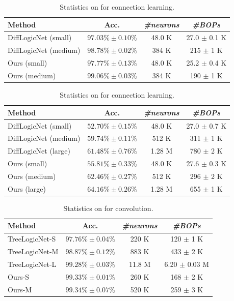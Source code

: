 \begin{table}[!htbp]
\centering
\caption{Statistics on \mnist for connection learning.}
\label{tb:DLGN_MNIST_rs}
\begin{tabular}{lccc}
\toprule
Method & Acc. & \emph{\#neurons} & \emph{\#BOPs} \\
\midrule
DiffLogicNet (small)    & $97.03\% \pm 0.10\%$ & 48.0 K & 27.0 $\pm$ 0.1 K \\
DiffLogicNet (medium)   & $98.78\% \pm 0.02\%$ & 384 K & 215 $\pm$ 1 K \\
\midrule
Ours (small)            & \textbf{$97.77\% \pm 0.13\%$} & 48.0 K & 25.2 $\pm$ 0.4 K \\
Ours (medium)           & \textbf{$99.06\% \pm 0.03\%$} & 384 K & 190 $\pm$ 1 K \\
\bottomrule
\end{tabular}
\end{table}

\begin{table}[!htbp]
\centering
\caption{Statistics on \cifar for connection learning.}
\label{tb:DLGN_CIFAR_rs}
\begin{tabular}{lccc}
\toprule
Method & Acc. & \emph{\#neurons} & \emph{\#BOPs} \\
\midrule
DiffLogicNet (small)    & $52.70\% \pm 0.15\%$ & 48.0 K & 27.0 $\pm$ 0.7 K \\
DiffLogicNet (medium)   & $59.74\% \pm 0.11\%$ & 512 K & 311 $\pm$ 1 K \\
DiffLogicNet (large)    & $61.48\% \pm 0.76\%$ & 1.28 M & 780 $\pm$ 2 K \\
\midrule
Ours (small)            & \textbf{$55.81\% \pm 0.33\%$} & 48.0 K & 27.6 $\pm$ 0.3 K \\
Ours (medium)            & \textbf{$62.46\% \pm 0.27\%$} & 512 K & 296 $\pm$ 2 K \\
Ours (large)            & \textbf{$64.16\% \pm 0.26\%$} & 1.28 M & 655 $\pm$ 1 K \\
\bottomrule
\end{tabular}
\end{table}

\begin{table}[!htbp]
\centering
\caption{Statistics on \mnist for convolution.}
\label{tb:CLGN_MNIST_rs}
\begin{tabular}{lccc}
\toprule
Method & Acc. & \emph{\#neurons} & \emph{\#BOPs} \\
\midrule
TreeLogicNet-S    & $97.76\% \pm 0.04\%$ & 220 K & 120 $\pm$ 1 K \\
TreeLogicNet-M    & $98.87\% \pm 0.12\%$ & 883 K & 433 $\pm$ 2 K \\
TreeLogicNet-L    & $99.28\% \pm 0.03\%$ & 11.8 M & 6.20 $\pm$ 0.03 M \\
\midrule
Ours-S            & \textbf{$99.33\% \pm 0.01\%$} & 260 K & 168 $\pm$ 2 K \\
Ours-M            & \textbf{$99.34\% \pm 0.07\%$} & 520 K & 259 $\pm$ 3 K \\
\bottomrule
\end{tabular}
\end{table}


